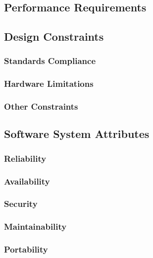 \documentclass[a4paper]{article}
\begin{document}
    \subsection{Performance Requirements}
    
    \subsection{Design Constraints}
    
        \subsubsection{Standards Compliance}
        
        \subsubsection{Hardware Limitations}
        
        \subsubsection{Other Constraints}
    
    \subsection{Software System Attributes}
        
        \subsubsection{Reliability}
        
        \subsubsection{Availability}
        
        \subsubsection{Security}
        
        \subsubsection{Maintainability}
        
        \subsubsection{Portability}
        
\end{document}
